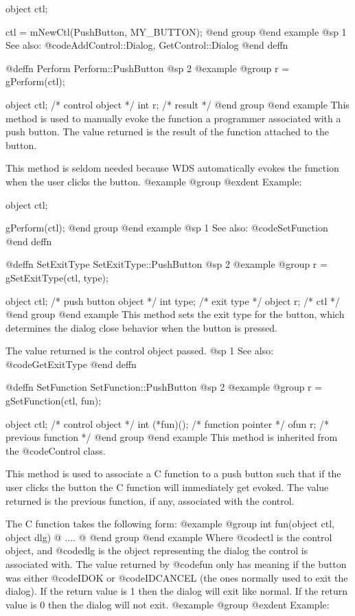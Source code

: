{object  ctl;

ctl = mNewCtl(PushButton, MY_BUTTON);
@end group
@end example
@sp 1
See also:  @code{AddControl::Dialog, GetControl::Dialog}
@end deffn









@deffn {Perform} Perform::PushButton
@sp 2
@example
@group
r = gPerform(ctl);

object  ctl;      /*  control object  */
int     r;        /*  result          */
@end group
@end example
This method is used to manually evoke the function a programmer associated 
with a push button.  The value returned is the result of the function
attached to the button.

This method is seldom needed because WDS automatically evokes the function
when the user clicks the button.
@example
@group
@exdent Example:

object  ctl;

gPerform(ctl);
@end group
@end example
@sp 1
See also:  @code{SetFunction}
@end deffn



@deffn {SetExitType} SetExitType::PushButton
@sp 2
@example
@group
r = gSetExitType(ctl, type);

object  ctl;    /*  push button object  */
int     type;   /*  exit type           */
object  r;      /*  ctl                 */
@end group
@end example
This method sets the exit type for the button, which determines the
dialog close behavior when the button is pressed.

The value returned is the control object passed.
@sp 1
See also:  @code{GetExitType}
@end deffn






@deffn {SetFunction} SetFunction::PushButton
@sp 2
@example
@group
r = gSetFunction(ctl, fun);

object  ctl;      /*  control object           */
int     (*fun)(); /*  function pointer         */
ofun    r;        /*  previous function        */
@end group
@end example
This method is inherited from the @code{Control} class.

This method is used to associate a C function to a push button such that
if the user clicks the button the C function will immediately get
evoked.  The value returned is the previous function, if any, associated
with the control.

The C function takes the following form:
@example
@group
int     fun(object ctl, object dlg)
@{
        ....
@}
@end group
@end example
Where @code{ctl} is the control object, and @code{dlg} is the object
representing the dialog the control is associated with.  The value
returned by @code{fun} only has meaning if the button was either
@code{IDOK} or @code{IDCANCEL} (the ones normally used to exit the
dialog).  If the return value is 1 then the dialog will exit like normal.
If the return value is 0 then the dialog will not exit.
@example
@group
@exdent Example:

}
